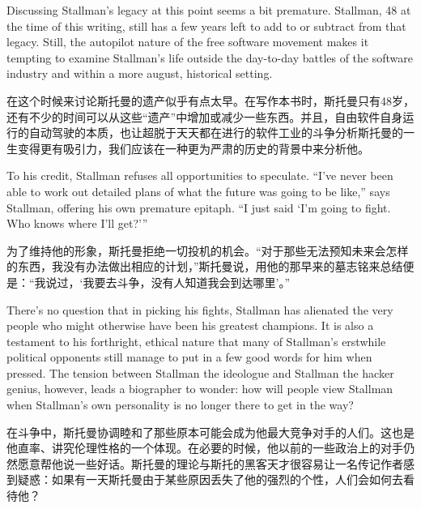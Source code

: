 \ifdefined\eng
Discussing Stallman's legacy at this point seems a bit premature. Stallman, 48 at the time of this writing, still has a few years left to add to or subtract from that legacy. Still, the autopilot nature of the free software movement makes it tempting to examine Stallman's life outside the day-to-day battles of the software industry and within a more august, historical setting.
\fi

\ifdefined\chs
在这个时候来讨论斯托曼的遗产似乎有点太早。在写作本书时，斯托曼只有48岁，还有不少的时间可以从这些``遗产''中增加或减少一些东西。并且，自由软件自身运行的自动驾驶的本质，也让超脱于天天都在进行的软件工业的斗争分析斯托曼的一生变得更有吸引力，我们应该在一种更为严肃的历史的背景中来分析他。
\fi

\ifdefined\eng
To his credit, Stallman refuses all opportunities to speculate. ``I've never been able to work out detailed plans of what the future was going to be like,'' says Stallman, offering his own premature epitaph. ``I just said `I'm going to fight. Who knows where I'll get?'\hspace{0.01in}''
\fi

\ifdefined\chs
为了维持他的形象，斯托曼拒绝一切投机的机会。``对于那些无法预知未来会怎样的东西，我没有办法做出相应的计划，''斯托曼说，用他的那早来的墓志铭来总结便是：``我说过，`我要去斗争，没有人知道我会到达哪里'。''
\fi

\ifdefined\eng
There's no question that in picking his fights, Stallman has alienated the very people who might otherwise have been his greatest champions. It is also a testament to his forthright, ethical nature that many of Stallman's erstwhile political opponents still manage to put in a few good words for him when pressed. The tension between Stallman the ideologue and Stallman the hacker genius, however, leads a biographer to wonder: how will people view Stallman when Stallman's own personality is no longer there to get in the way?
\fi

\ifdefined\chs
在斗争中，斯托曼协调睦和了那些原本可能会成为他最大竞争对手的人们。这也是他直率、讲究伦理性格的一个体现。在必要的时候，他以前的一些政治上的对手仍然愿意帮他说一些好话。斯托曼的理论与斯托的黑客天才很容易让一名传记作者感到疑惑：如果有一天斯托曼由于某些原因丢失了他的强烈的个性，人们会如何去看待他？
\fi

